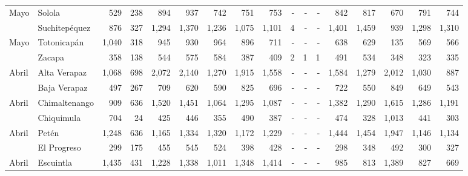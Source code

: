 \begin{landscape}
\begin{center}
\begin{longtable}{llrrrrrrrrrrrrrrr}
			\multicolumn{1}{l}{	\footnotesize	 Mayo 	}&	 Solola 	&	 529 	&	 238 	&	 894 	&	 937 	&	 742 	&	 751 	&	 753 	&	 -   	&	 -   	&	 -   	&	 842 	&	 817 	&	 670 	&	 791 	&	 744 	\\
			\rowcolor{color1!5!white}\multicolumn{1}{l}{	\footnotesize	 Mayo 	}&	 Suchitepéquez 	&	 876 	&	 327 	&	 1,294 	&	 1,370 	&	 1,236 	&	 1,075 	&	 1,101 	&	 4 	&	 -   	&	 -   	&	 1,401 	&	 1,459 	&	 939 	&	 1,298 	&	 1,310 	\\
			\multicolumn{1}{l}{	\footnotesize	 Mayo 	}&	 Totonicapán 	&	 1,040 	&	 318 	&	 945 	&	 930 	&	 964 	&	 896 	&	 711 	&	 -   	&	 -   	&	 -   	&	 638 	&	 629 	&	 135 	&	 569 	&	 566 	\\
			\rowcolor{color1!5!white}\multicolumn{1}{l}{	\footnotesize	 Mayo 	}&	 Zacapa 	&	 358 	&	 138 	&	 544 	&	 575 	&	 584 	&	 387 	&	 409 	&	 2 	&	 1 	&	 1 	&	 491 	&	 534 	&	 348 	&	 323 	&	 335 	\\
			\multicolumn{1}{l}{	\footnotesize	 Abril 	}&	 Alta Verapaz 	&	 1,068 	&	 698 	&	 2,072 	&	 2,140 	&	 1,270 	&	 1,915 	&	 1,558 	&	 -   	&	 -   	&	 -   	&	 1,584 	&	 1,279 	&	 2,012 	&	 1,030 	&	 887 	\\
			\rowcolor{color1!5!white}\multicolumn{1}{l}{	\footnotesize	 Abril 	}&	 Baja Verapaz 	&	 497 	&	 267 	&	 709 	&	 620 	&	 590 	&	 825 	&	 696 	&	 -   	&	 -   	&	 -   	&	 722 	&	 550 	&	 849 	&	 649 	&	 543 	\\
			\multicolumn{1}{l}{	\footnotesize	 Abril 	}&	 Chimaltenango 	&	 909 	&	 636 	&	 1,520 	&	 1,451 	&	 1,064 	&	 1,295 	&	 1,087 	&	 -   	&	 -   	&	 -   	&	 1,382 	&	 1,290 	&	 1,615 	&	 1,286 	&	 1,191 	\\
			\rowcolor{color1!5!white}\multicolumn{1}{l}{	\footnotesize	 Abril 	}&	 Chiquimula 	&	 704 	&	 24 	&	 425 	&	 446 	&	 355 	&	 490 	&	 387 	&	 -   	&	 -   	&	 -   	&	 474 	&	 328 	&	 1,013 	&	 441 	&	 303 	\\
			\multicolumn{1}{l}{	\footnotesize	 Abril 	}&	 Petén 	&	 1,248 	&	 636 	&	 1,165 	&	 1,334 	&	 1,320 	&	 1,172 	&	 1,229 	&	 -   	&	 -   	&	 -   	&	 1,444 	&	 1,454 	&	 1,947 	&	 1,146 	&	 1,134 	\\
			\rowcolor{color1!5!white}\multicolumn{1}{l}{	\footnotesize	 Abril 	}&	 El Progreso 	&	 299 	&	 175 	&	 455 	&	 545 	&	 524 	&	 398 	&	 428 	&	 -   	&	 -   	&	 -   	&	 298 	&	 348 	&	 492 	&	 300 	&	 327 	\\
			\multicolumn{1}{l}{	\footnotesize	 Abril 	}&	 Escuintla 	&	 1,435 	&	 431 	&	 1,228 	&	 1,338 	&	 1,011 	&	 1,348 	&	 1,414 	&	 -   	&	 -   	&	 -   	&	 985 	&	 813 	&	 1,389 	&	 827 	&	 669 	\\

\end{longtable}
\end{center}
\end{landscape}
